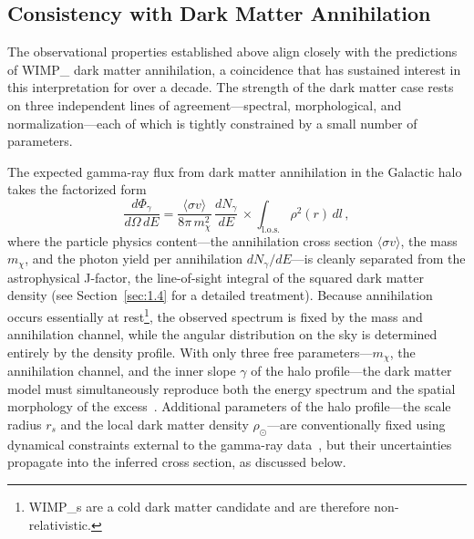 \subsection{Consistency with Dark Matter Annihilation}
\label{sec:4.1.4}

The observational properties established above align closely with the predictions of \gls{WIMP_} dark matter annihilation, a coincidence that has sustained interest in this interpretation for over a decade.
The strength of the dark matter case rests on three independent lines of agreement---spectral, morphological, and normalization---each of which is tightly constrained by a small number of parameters.

The expected gamma-ray flux from dark matter annihilation in the Galactic halo takes the factorized form
\begin{equation}
	\frac{d\Phi_\gamma}{d\Omega\, dE} = \frac{\langle \sigma v \rangle}{8\pi\, m_\chi^2}\, \frac{dN_\gamma}{dE}\, \times \int_{\mathrm{l.o.s.}} \rho^2(r)\, dl\,,
	\label{eq:dm_flux_gce}
\end{equation}
where the particle physics content---the annihilation cross section $\langle \sigma v \rangle$, the \WIMP mass $m_\chi$, and the photon yield per annihilation $dN_\gamma/dE$---is cleanly separated from the astrophysical J-factor, the line-of-sight integral of the squared dark matter density (see Section~\ref{sec:1.4} for a detailed treatment).
Because annihilation occurs essentially at rest\footnote{\Glspl{WIMP_} are a cold dark matter candidate and are therefore non-relativistic.}, the observed spectrum is fixed by the mass and annihilation channel, while the angular distribution on the sky is determined entirely by the density profile.
With only three free parameters---$m_\chi$, the annihilation channel, and the inner slope $\gamma$ of the halo profile---the dark matter model must simultaneously reproduce both the energy spectrum and the spatial morphology of the excess~\cite{Daylan:2014rsa}.
Additional parameters of the halo profile---the scale radius $r_s$ and the local dark matter density $\rho_\odot$---are conventionally fixed using dynamical constraints external to the gamma-ray data~\cite{Abazajian:2014fta,Daylan:2014rsa}, but their uncertainties propagate into the inferred cross section, as discussed below.

